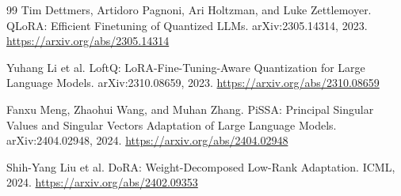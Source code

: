\documentclass[11pt]{article}
\begin{document}
\begin{thebibliography}{99}
Tim Dettmers, Artidoro Pagnoni, Ari Holtzman, and Luke Zettlemoyer.
\newblock QLoRA: Efficient Finetuning of Quantized LLMs.
\newblock arXiv:2305.14314, 2023.
\newblock \url{https://arxiv.org/abs/2305.14314}

Yuhang Li et al.
\newblock LoftQ: LoRA-Fine-Tuning-Aware Quantization for Large Language Models.
\newblock arXiv:2310.08659, 2023.
\newblock \url{https://arxiv.org/abs/2310.08659}

Fanxu Meng, Zhaohui Wang, and Muhan Zhang.
\newblock PiSSA: Principal Singular Values and Singular Vectors Adaptation of Large Language Models.
\newblock arXiv:2404.02948, 2024.
\newblock \url{https://arxiv.org/abs/2404.02948}

Shih-Yang Liu et al.
\newblock DoRA: Weight-Decomposed Low-Rank Adaptation.
\newblock ICML, 2024.
\newblock \url{https://arxiv.org/abs/2402.09353}

\end{thebibliography}
\end{document}
